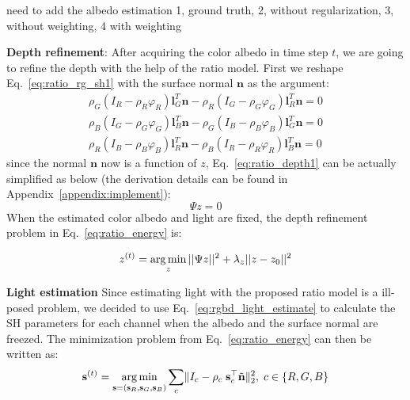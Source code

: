 {\color{red} need to add the albedo estimation 1, ground truth, 2, without regularization, 3, without weighting, 4 with weighting}

\textbf{Depth refinement}:
After acquiring the color albedo in time step $t$, we are going to refine the depth with the help of the ratio model.
First we reshape Eq.~\ref{eq:ratio_rg_sh1} with the surface normal $\mathbf{n}$ as the argument:
\begin{equation}\label{eq:ratio_depth1}
\begin{split}
\rho_G (I_R - \rho_R \varphi_R)\mathbf{l}_G^T \mathbf{n} - \rho_R (I_G - \rho_G \varphi_G)\mathbf{l}_R^T\mathbf{n} = 0\\
\rho_B (I_G - \rho_G \varphi_G)\mathbf{l}_B^T \mathbf{n} - \rho_G (I_B - \rho_B \varphi_B)\mathbf{l}_G^T\mathbf{n} = 0\\
\rho_R (I_B - \rho_B \varphi_B)\mathbf{l}_R^T \mathbf{n} - \rho_B (I_R - \rho_R \varphi_R)\mathbf{l}_B^T\mathbf{n} = 0 
\end{split}
\end{equation}
since the normal $\mathbf{n}$ now is a function of $z$, Eq.~\ref{eq:ratio_depth1} can be actually simplified as below (the derivation details can be found in Appendix~\ref{appendix:implement}):
\begin{equation}
    \Psi z = 0
\end{equation}
When the estimated color albedo and light are fixed, the depth refinement problem in Eq.~\ref{eq:ratio_energy} is:

\begin{equation}\label{eq:ratio_depth_refine}
    z^{(t)}= \operatorname*{arg\,min}_{z}  ||\Psi z||^2 + \lambda_z||z - z_0||^2
\end{equation}

\textbf{Light estimation}
Since estimating light with the proposed ratio model is a ill-posed problem, we decided to use Eq.~\ref{eq:rgbd_light_estimate} to calculate the SH parameters for each channel when the albedo and the surface normal are freezed. The minimization problem from Eq.~\ref{eq:ratio_energy} can then be written as:
\begin{equation}\label{eq:ratio_light_estimate}
    \mathbf{s}^{(t)} = \operatorname*{arg\,min}_{\mathbf{s} = (\mathbf{s}_R, \mathbf{s}_G, \mathbf{s}_B)}\sum_{c} \lVert I_c - \rho_c \; \mathbf{s}_c^\top \tilde{\mathbf{n}} \rVert^2_2, \; c\in\{R,G,B\}
\end{equation}

